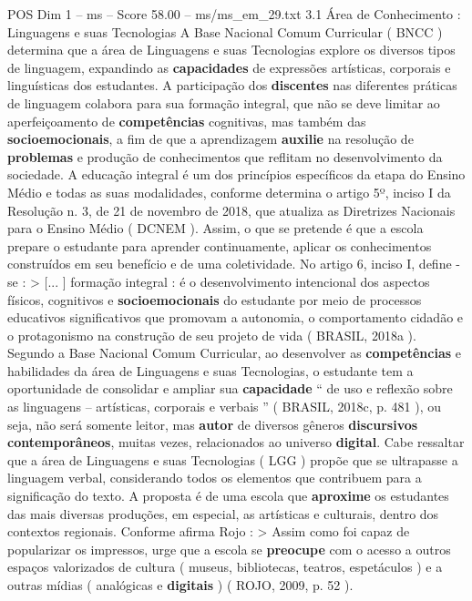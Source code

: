\begin{textsample}{POS Dim 1 – ms – Score 58.00 – ms/ms\_em\_29.txt}  \label{ex:f1_pos_183}
3.1 Área de Conhecimento : Linguagens e suas Tecnologias A Base Nacional Comum Curricular ( BNCC ) determina que a área de Linguagens e suas Tecnologias explore os diversos tipos de linguagem, expandindo as \textbf{capacidades} de expressões artísticas, corporais e linguísticas dos estudantes.
A participação dos \textbf{discentes} nas diferentes práticas de linguagem colabora para sua formação integral, que não se deve limitar ao aperfeiçoamento de \textbf{competências} cognitivas, mas também das \textbf{socioemocionais}, a fim de que a aprendizagem \textbf{auxilie} na resolução de \textbf{problemas} e produção de conhecimentos que reflitam no desenvolvimento da sociedade.
A educação integral é um dos princípios específicos da etapa do Ensino Médio e todas as suas modalidades, conforme determina o artigo 5º, inciso I da Resolução n. 3, de 21 de novembro de 2018, que atualiza as Diretrizes Nacionais para o Ensino Médio ( DCNEM ).
Assim, o que se pretende é que a escola prepare o estudante para aprender continuamente, aplicar os conhecimentos construídos em seu benefício e de uma coletividade.
No artigo 6, inciso I, define -se : > [... ] formação integral : é o desenvolvimento intencional dos aspectos físicos, cognitivos e \textbf{socioemocionais} do estudante por meio de processos educativos significativos que promovam a autonomia, o comportamento cidadão e o protagonismo na construção de seu projeto de vida ( BRASIL, 2018a ).
Segundo a Base Nacional Comum Curricular, ao desenvolver as \textbf{competências} e habilidades da área de Linguagens e suas Tecnologias, o estudante tem a oportunidade de consolidar e ampliar sua \textbf{capacidade} “ de uso e reflexão sobre as linguagens – artísticas, corporais e verbais ” ( BRASIL, 2018c, p. 481 ), ou seja, não será somente leitor, mas \textbf{autor} de diversos gêneros \textbf{discursivos} \textbf{contemporâneos}, muitas vezes, relacionados ao universo \textbf{digital}.
Cabe ressaltar que a área de Linguagens e suas Tecnologias ( LGG ) propõe que se ultrapasse a linguagem verbal, considerando todos os elementos que contribuem para a significação do texto.
A proposta é de uma escola que \textbf{aproxime} os estudantes das mais diversas produções, em especial, as artísticas e culturais, dentro dos contextos regionais.
Conforme afirma Rojo : > Assim como foi capaz de popularizar os impressos, urge que a escola se \textbf{preocupe} com o acesso a outros espaços valorizados de cultura ( museus, bibliotecas, teatros, espetáculos ) e a outras mídias ( analógicas e \textbf{digitais} ) ( ROJO, 2009, p. 52 ).

\end{textsample}
